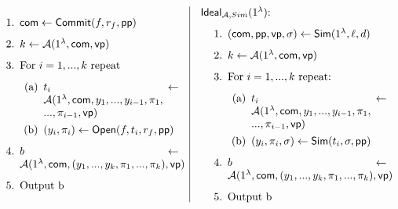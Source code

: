 \begin{framed}
\begin{enumerate}
\begin{align*}
\begin{minipage}{.5\linewidth}
\begin{enumerate}
							\item $\comm \leftarrow \Commit(f, r_f, \pp)$
							\item $k\leftarrow \mathcal{A}(1^\lambda, \comm, \vp)$
							\item \text{For $i=1,...,k$ repeat}
							\begin{enumerate}
								\item $t_i \leftarrow \A(1^\lambda, \comm, y_1, ..., y_{i-1}, \pi_1,\\ ..., \pi_{i-1}, \vp)$
								\item $(y_i, \pi_i) \leftarrow \Open(f, t_i, r_f, \pp)$
							\end{enumerate}
							\item $b \leftarrow \A(1^\lambda, \comm, (y_1, ..., y_k, \pi_1, ..., \pi_k), \vp)$
							\item \text{Output b}
						\end{enumerate}
					\end{minipage}
					\hspace*{10pt}\vline \hspace*{10pt}
					\begin{minipage}{.5\linewidth}
						$\mathsf{Ideal}_{\A, Sim}(1^\lambda)$:
						\begin{enumerate}
							\item $(\comm, \pp, \vp, \sigma) \leftarrow \mathsf{Sim}(1^\lambda, \ell, d)$
							\item $k \leftarrow \A(1^\lambda, \comm, \vp)$
							\item \text{For $i=1,...,k$ repeat}:
							\begin{enumerate}
								\item $t_i \leftarrow \A(1^\lambda, \comm, y_1, ..., y_{i-1}, \pi_1,\\ ..., \pi_{i-1}, \vp)$
								\item $(y_i, \pi_i, \sigma) \leftarrow \mathsf{Sim}(t_i, \sigma, \pp)$
							\end{enumerate}
							\item $b \leftarrow \A(1^\lambda, \comm, (y_1, ..., y_k, \pi_1, ..., \pi_k), \vp)$
							\item \text{Output b}
						\end{enumerate}
					\end{minipage}
				\end{align*}
		\end{enumerate}
\end{framed}



